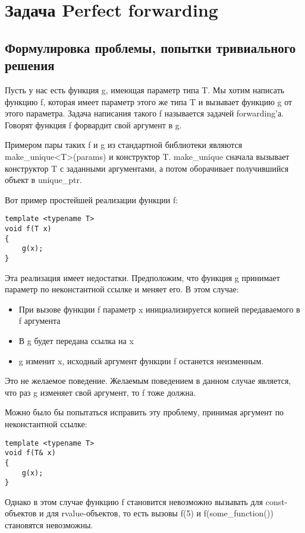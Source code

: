 \section{Задача Perfect forwarding}

\subsection{Формулировка проблемы, попытки тривиального решения}

Пусть у нас есть функция g, имеющая параметр типа T. Мы хотим написать функцию f, которая имеет параметр этого же типа T и вызывает функцию g от этого параметра. Задача написания такого f называется задачей forwarding'а. Говорят функция f форвардит свой аргумент в g.

Примером пары таких f и g из стандартной библиотеки являются make\_unique<T>(params) и конструктор T. make\_unique сначала вызывает конструктор T с заданными аргументами, а потом оборачивает получившийся объект в unique\_ptr.

Вот пример простейшей реализации функции f:
\begin{verbatim}
template <typename T>
void f(T x)
{
    g(x);
}
\end{verbatim}

Эта реализация имеет недостатки. Предположим, что функция g принимает параметр по неконстантной ссылке и меняет его. В этом случае:

\begin{itemize}
\item При вызове функции f параметр x инициализируется копией передаваемого в f аргумента
\item В g будет передана ссылка на x
\item g изменит x, исходный аргумент функции f останется неизменным.
\end{itemize}

Это не желаемое поведение. Желаемым поведением в данном случае является, что раз g изменяет свой аргумент, то f тоже должна.

Можно было бы попытаться исправить эту проблему, принимая аргумент по неконстантной ссылке:
\begin{verbatim}
template <typename T>
void f(T& x)
{
    g(x);
}
\end{verbatim}

Однако в этом случае функцию f становится невозможно вызывать для const-объектов и для rvalue-объектов, то есть вызовы f(5) и f(some\_function()) становятся невозможны.

